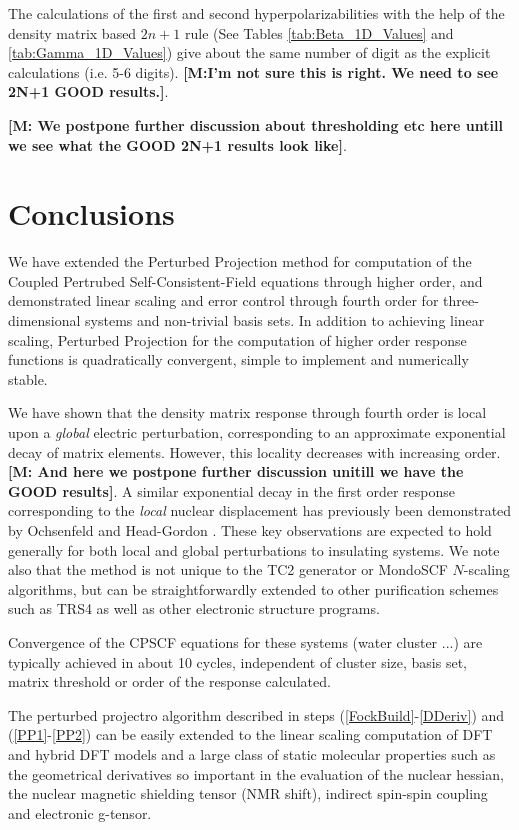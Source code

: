 \documentclass[prl,aps,letterpaper,twocolumn,showpacs,twocolumngrid,superbib]{revtex4}
\begin{document}
The calculations of the first and second hyperpolarizabilities with the help of
the density matrix based $2n+1$ rule (See Tables \ref{tab:Beta_1D_Values} and \ref{tab:Gamma_1D_Values}) 
give about the same number of digit as the explicit calculations (i.e. 5-6 digits).
{\bf [M:I'm not sure this is right.  We need to see 2N+1 GOOD results.]}.

{\bf [M: We postpone further discussion about thresholding etc here untill we see what the GOOD 2N+1 results look like]}.

\newpage

\section{Conclusions}
We have extended the Perturbed Projection method for computation of 
the Coupled Pertrubed Self-Consistent-Field equations through higher order, 
and demonstrated linear scaling and error control through fourth order for 
three-dimensional systems and non-trivial basis sets.   In addition to 
achieving linear scaling,  Perturbed Projection for the computation of 
higher order response functions is quadratically convergent, simple to 
implement and numerically stable. 

We have shown that the density matrix response through fourth order is local 
upon a {\em global} electric perturbation, corresponding to an approximate 
exponential decay of matrix elements.  However, this locality decreases with
increasing order. {\bf [M: And here we postpone further discussion unitill
we have the GOOD results]}.
 A similar exponential decay
in the first order response corresponding to the {\em local} nuclear 
displacement has previously been demonstrated by Ochsenfeld and 
Head-Gordon \cite{Ochsenfeld97}. These key observations are expected to
hold generally for both local and global perturbations to insulating systems.  
We note also that the method is not unique to the TC2 generator or 
{\sc MondoSCF} $N$-scaling algorithms, but can be straightforwardly 
extended to other purification schemes such as TRS4 \cite{ANiklasson03} as
well as other electronic structure programs.

Convergence of the CPSCF equations for these systems (water cluster ...)
are typically achieved in about 10 cycles, independent of cluster size, basis set,
matrix threshold or order of the response calculated.

The perturbed projectro algorithm described in steps (\ref{FockBuild}-\ref{DDeriv}) and 
(\ref{PP1}-\ref{PP2})
can be easily extended to the linear scaling computation of
DFT and hybrid DFT models and a large class of static molecular properties
such as the geometrical derivatives so important
in the evaluation of the nuclear hessian, the nuclear magnetic
shielding tensor (NMR shift), indirect spin-spin coupling and
electronic g-tensor.
\end{document}
